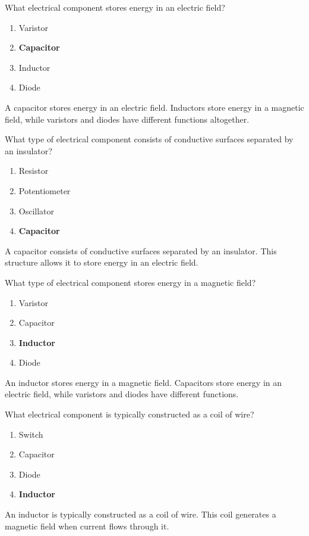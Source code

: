 \begin{tcolorbox}[colback=gray!10!white,colframe=black!75!black,title={T6A04}]
    What electrical component stores energy in an electric field?
    \begin{enumerate}[label=\Alph*),noitemsep]
        \item Varistor
        \item \textbf{Capacitor}
        \item Inductor
        \item Diode
    \end{enumerate}
\end{tcolorbox}
A capacitor stores energy in an electric field. Inductors store energy in a magnetic field, while varistors and diodes have different functions altogether.

\begin{tcolorbox}[colback=gray!10!white,colframe=black!75!black,title={T6A05}]
    What type of electrical component consists of conductive surfaces separated by an insulator?
    \begin{enumerate}[label=\Alph*),noitemsep]
        \item Resistor
        \item Potentiometer
        \item Oscillator
        \item \textbf{Capacitor}
    \end{enumerate}
\end{tcolorbox}
A capacitor consists of conductive surfaces separated by an insulator. This structure allows it to store energy in an electric field.

\begin{tcolorbox}[colback=gray!10!white,colframe=black!75!black,title={T6A06}]
    What type of electrical component stores energy in a magnetic field?
    \begin{enumerate}[label=\Alph*),noitemsep]
        \item Varistor
        \item Capacitor
        \item \textbf{Inductor}
        \item Diode
    \end{enumerate}
\end{tcolorbox}
An inductor stores energy in a magnetic field. Capacitors store energy in an electric field, while varistors and diodes have different functions.

\begin{tcolorbox}[colback=gray!10!white,colframe=black!75!black,title={T6A07}]
    What electrical component is typically constructed as a coil of wire?
    \begin{enumerate}[label=\Alph*),noitemsep]
        \item Switch
        \item Capacitor
        \item Diode
        \item \textbf{Inductor}
    \end{enumerate}
\end{tcolorbox}
An inductor is typically constructed as a coil of wire. This coil generates a magnetic field when current flows through it.

